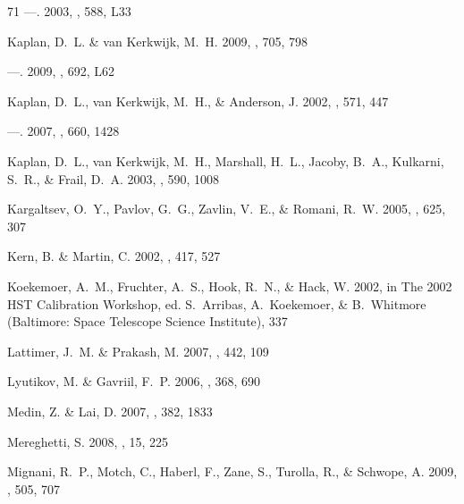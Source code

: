 \documentclass[iop]{emulateapj}
\begin{document}
\begin{thebibliography}{71}
---. 2003{}, \apjl, 588, L33

{Kaplan}, D.~L. \& {van Kerkwijk}, M.~H. 2009{}, \apj, 705, 798

---. 2009{}, \apjl, 692, L62

{Kaplan}, D.~L., {van Kerkwijk}, M.~H., \& {Anderson}, J. 2002{},
  \apj, 571, 447

---. 2007, \apj, 660, 1428

{Kaplan}, D.~L., {van Kerkwijk}, M.~H., {Marshall}, H.~L., {Jacoby}, B.~A.,
  {Kulkarni}, S.~R., \& {Frail}, D.~A. 2003{}, \apj, 590, 1008

{Kargaltsev}, O.~Y., {Pavlov}, G.~G., {Zavlin}, V.~E., \& {Romani}, R.~W. 2005,
  \apj, 625, 307

{Kern}, B. \& {Martin}, C. 2002, \nat, 417, 527

{Koekemoer}, A.~M., {Fruchter}, A.~S., {Hook}, R.~N., \& {Hack}, W. 2002, in
  The 2002 HST Calibration Workshop, ed. S.~{Arribas}, A.~{Koekemoer}, \&
  B.~{Whitmore} (Baltimore: Space Telescope Science Institute), 337

{Lattimer}, J.~M. \& {Prakash}, M. 2007, \physrep, 442, 109

{Lyutikov}, M. \& {Gavriil}, F.~P. 2006, \mnras, 368, 690

{Medin}, Z. \& {Lai}, D. 2007, \mnras, 382, 1833

{Mereghetti}, S. 2008, \aapr, 15, 225

{Mignani}, R.~P., {Motch}, C., {Haberl}, F., {Zane}, S., {Turolla}, R., \&
  {Schwope}, A. 2009, \aap, 505, 707


\end{thebibliography}
\end{document}
